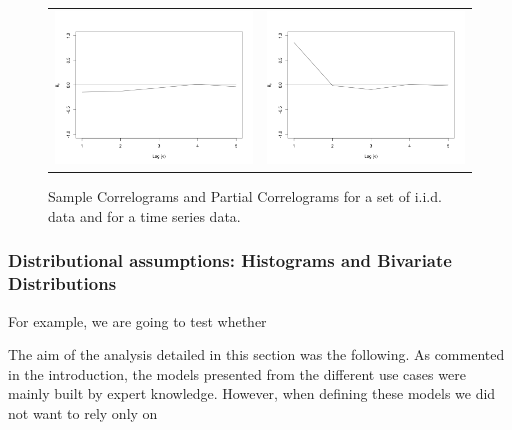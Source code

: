 \begin{figure}
\begin{center}
\begin{tabular}{cc}
\includegraphics[scale=0.25]{./figures/PartialCorrelogramGaussian} &
\includegraphics[scale=0.25]{./figures/PartialCorrelogramTimeSerie} \\
\end{tabular}
\caption{\label{Figure:PreliminariesCorrelograms}Sample Correlograms and Partial Correlograms for a set of i.i.d. data and for a time series data. 
}
\end{center}
\end{figure}




\subsubsection*{Distributional assumptions: Histograms and Bivariate Distributions}





For example, we are going to test whether



The aim of the analysis detailed in this section was the following. As commented in the introduction, the models presented from the different use cases were mainly built by expert knowledge. However, when defining these models we did not want to rely only on 
